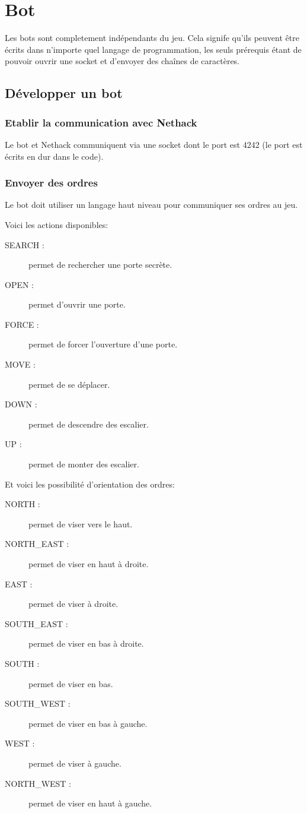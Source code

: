\chapter{Bot}

Les bots sont completement indépendants du jeu. Cela signife qu'ils peuvent être écrits dans n'importe quel langage de programmation, les seuls prérequis étant de pouvoir ouvrir une socket et d'envoyer des chaînes de caractères.

\section{Développer un bot}

\subsection{Etablir la communication avec Nethack}
Le bot et Nethack communiquent via une socket dont le port est 4242 (le port est écrits en dur dans le code).

\subsection{Envoyer des ordres}
Le bot doit utiliser un langage haut niveau pour communiquer ses ordres au jeu.


Voici les actions disponibles:

\begin{description}
\item[SEARCH :] permet de rechercher une porte secrète.
\item[OPEN :] permet d'ouvrir une porte.
\item[FORCE :] permet de forcer l'ouverture d'une porte.
\item[MOVE :] permet de se déplacer.
\item[DOWN :] permet de descendre des escalier. 
\item[UP :] permet de monter des escalier.
\end{description}

Et voici les possibilité d'orientation des ordres:

\begin{description}
\item[NORTH :] permet de viser vers le haut.
\item[NORTH\_EAST :] permet de viser en haut à droite.
\item[EAST :] permet de viser à droite.
\item[SOUTH\_EAST :] permet de viser en bas à droite.
\item[SOUTH :] permet de viser en bas.
\item[SOUTH\_WEST :] permet de viser en bas à gauche.
\item[WEST :] permet de viser à gauche.
\item[NORTH\_WEST :] permet de viser en haut à gauche.
\end{description}

